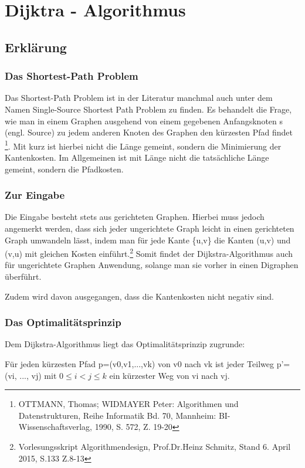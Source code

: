 \chapter{Dijktra - Algorithmus}

\section{Erklärung}

\subsection{Das Shortest-Path Problem}
Das Shortest-Path Problem ist in der Literatur manchmal auch unter dem Namen Single-Source Shortest Path Problem zu finden. 
Es behandelt die Frage, wie man in einem Graphen ausgehend von einem gegebenen Anfangsknoten s (engl. Source) zu jedem anderen Knoten des Graphen den kürzesten Pfad findet \footnote{OTTMANN, Thomas; WIDMAYER Peter: Algorithmen und Datenstrukturen, Reihe Informatik Bd. 70, Mannheim: BI-Wissenschaftsverlag, 1990, S. 572, Z. 19-20}. Mit kurz ist hierbei nicht die Länge gemeint, sondern die Minimierung der Kantenkosten. Im Allgemeinen ist mit Länge nicht die tatsächliche Länge gemeint, sondern die Pfadkosten.


\subsection{Zur Eingabe}
Die Eingabe besteht stets aus gerichteten Graphen. Hierbei muss jedoch angemerkt werden, dass sich jeder ungerichtete Graph leicht in einen gerichteten Graph umwandeln lässt, indem man für jede Kante \{u,v\} die Kanten (u,v) und (v,u) mit gleichen Kosten einführt.\footnote{Vorlesungsskript Algorithmendesign, Prof.Dr.Heinz Schmitz, Stand 6. April 2015, S.133 Z.8-13} Somit findet der Dijkstra-Algorithmus auch für ungerichtete Graphen Anwendung, solange man sie vorher in einen Digraphen überführt. 

\parindent0pt Zudem wird davon ausgegangen, dass die Kantenkosten nicht negativ sind.

\subsection{Das Optimalitätsprinzip}
Dem Dijkstra-Algorithmus liegt das Optimalitätsprinzip zugrunde:

\parindent0pt Für jeden kürzesten Pfad p=(v{\tiny 0},v{\tiny 1},...,v{\tiny k}) von v{\tiny 0} nach v{\tiny k} ist jeder Teilweg p'=(v{\tiny i}, ..., v{\tiny j}) mit $0 \le i < j \le k$ ein kürzester Weg von v{\tiny i} nach v{\tiny j}.

